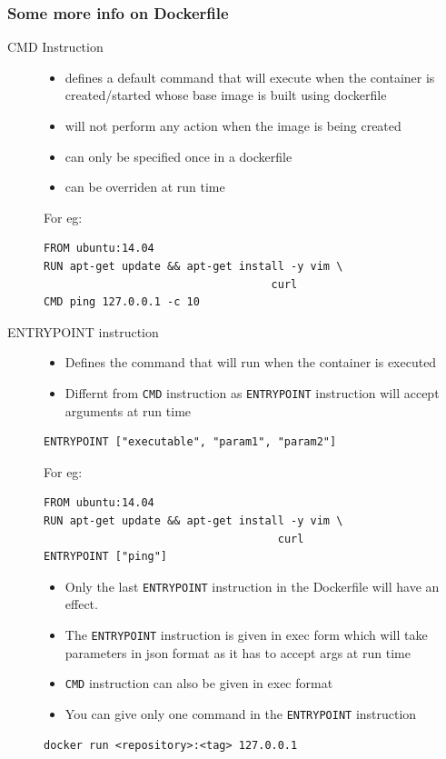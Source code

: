 \documentclass[11pt]{article}
\begin{document}
\subsubsection{Some more info on Dockerfile}
\label{sec:orgheadline22}
\begin{description}
\item[{CMD Instruction}] \begin{itemize}
\item defines a default command that will execute when the container is
created/started whose base image is built using dockerfile
\item will not perform any action when the image is being created
\item can only be specified once in a dockerfile
\item can be overriden at run time
\end{itemize}
For eg:
\begin{verbatim}
FROM ubuntu:14.04
RUN apt-get update && apt-get install -y vim \
                                   curl
CMD ping 127.0.0.1 -c 10
\end{verbatim}
\item[{ENTRYPOINT instruction}] \begin{itemize}
\item Defines the command that will run when the container is executed
\item Differnt from \texttt{CMD} instruction as \texttt{ENTRYPOINT} instruction will accept
arguments at run time
\end{itemize}
\begin{verbatim}
ENTRYPOINT ["executable", "param1", "param2"]
\end{verbatim}
For eg:
\begin{verbatim}
FROM ubuntu:14.04
RUN apt-get update && apt-get install -y vim \
                                    curl
ENTRYPOINT ["ping"]
\end{verbatim}
\begin{itemize}
\item Only the last \texttt{ENTRYPOINT} instruction in the Dockerfile will have an effect.
\item The \texttt{ENTRYPOINT} instruction is given in exec form which will take
parameters in json format as it has to accept args at run time
\item \texttt{CMD} instruction can also be given in exec format
\item You can give only one command in the \texttt{ENTRYPOINT} instruction
\end{itemize}
\begin{verbatim}
docker run <repository>:<tag> 127.0.0.1
\end{verbatim}


\end{description}
\end{document}
